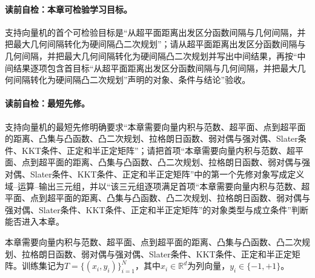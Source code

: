 \paragraph{读前自检：本章可检验学习目标。}支持向量机的首个可检验目标是“从超平面距离出发区分函数间隔与几何间隔，并把最大几何间隔转化为硬间隔凸二次规划”；请从超平面距离出发区分函数间隔与几何间隔，并把最大几何间隔转化为硬间隔凸二次规划并写出中间结果，再按“中间结果逐项包含首目标“从超平面距离出发区分函数间隔与几何间隔，并把最大几何间隔转化为硬间隔凸二次规划”声明的对象、条件与结论”验收。\par


\label{struct:V3-C02-CH02}
\paragraph{读前自检：最短先修。}支持向量机的最短先修明确要求“本章需要向量内积与范数、超平面、点到超平面的距离、凸集与凸函数、凸二次规划、拉格朗日函数、弱对偶与强对偶、Slater条件、KKT条件、正定和半正定矩阵”；请把首项“本章需要向量内积与范数、超平面、点到超平面的距离、凸集与凸函数、凸二次规划、拉格朗日函数、弱对偶与强对偶、Slater条件、KKT条件、正定和半正定矩阵”中的第一个先修对象写成定义域--运算--输出三元组，并以“该三元组逐项满足首项“本章需要向量内积与范数、超平面、点到超平面的距离、凸集与凸函数、凸二次规划、拉格朗日函数、弱对偶与强对偶、Slater条件、KKT条件、正定和半正定矩阵”的对象类型与成立条件”判断能否进入本章。\par

\begin{prerequisitebox}
本章需要向量内积与范数、超平面、点到超平面的距离、凸集与凸函数、凸二次规划、拉格朗日函数、弱对偶与强对偶、Slater条件、KKT条件、正定和半正定矩阵。训练集记为$T=\{(x_i,y_i)\}_{i=1}^{N}$，其中$x_i\in\mathbb R^d$为列向量，$y_i\in\{-1,+1\}$。
\end{prerequisitebox}

